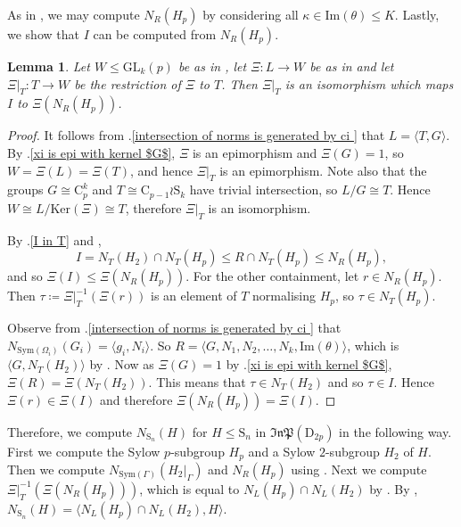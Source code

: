 \documentclass[11pt,a4paper]{article}
\newtheorem{lemma}[theorem]{Lemma}
\theoremstyle{definition}
\theoremstyle{remark}
\newcommand{\Sym}[0]{\mathrm{Sym}}
\newcommand{\InP}{\mathfrak{InP}}
\newcommand{\Sy}{\mathrm{S}}
\newcommand{\Cy}{\mathrm{C}}
\newcommand{\Di}{\mathrm{D}}
\newcommand{\Ker}{\mathrm{Ker}}
\begin{document}
As in , we may compute $N_{R}(H_p)$ by considering all $\kappa \in \mathrm{Im}(\theta) \leq K$. 
Lastly, we show that $I$ can be computed from $N_{R}(H_p)$. 


\begin{lemma}  \label{compute I from norm of groups in inp}
Let $W \leq \mathrm{GL}_k(p)$ be as in , 
let $\Xi: L \rightarrow W$ be as in  and let $\Xi|_{T} : T \rightarrow W$ be the restriction of $\Xi$ to $ T$. 
Then $\Xi|_{T}$ is an isomorphism which maps $I$ to $\Xi(N_{R}(H_p))$. 
\end{lemma}


\begin{proof}
It follows from .\ref{intersection of norms is generated by ci } that $L = \langle T, G \rangle$. 
By .\ref{xi is epi with kernel $G$}, $\Xi$ is an epimorphism and $\Xi(G)=1$, so $W = \Xi(L) = \Xi(T)$, and hence $\Xi|_T$ is an epimorphism. 
Note also that the groups $G \cong \Cy_p^k$ and $T \cong \Cy_{p-1} \wr \Sy_k$ have trivial intersection, so $L/G \cong T$. 
Hence $W \cong L/\Ker(\Xi) \cong T$, therefore $\Xi|_T$ is an isomorphism. 


By .\ref{I in T} and ,  
\[ I  = N_T(H_2) \cap N_T(H_p) \leq R \cap N_{T}(H_p) \leq N_{R}(H_p), \]
and so $\Xi(I) \leq \Xi(N_{R}(H_p))$. 
For the other containment, let $r \in N_{R}(H_p)$.
Then $\tau \coloneqq \Xi|_{T}^{-1}(\Xi(r))$ is an element of $T$ normalising $H_p$, so $\tau \in N_T(H_p)$. 

Observe from .\ref{intersection of norms is generated by ci } that  $N_{\Sym(\Omega_i)}(G_i) = \langle g_i, N_i \rangle$. So $R = \langle  G, N_1, N_2, \ldots, N_k, \mathrm{Im}(\theta) \rangle$, which is $\langle G, N_T(H_2) \rangle$ by .  
Now as $\Xi(G)=1$ by .\ref{xi is epi with kernel $G$}, $\Xi(R) = \Xi(N_T(H_2))$. 
This means that $\tau \in N_T(H_2)$ and so $\tau \in I$. Hence $\Xi(r) \in \Xi(I)$ and therefore $\Xi(N_{R}(H_p)) = \Xi(I)$. 
\end{proof}

Therefore, we compute $N_{\Sy_n}(H)$ for $H \leq \Sy_n$ in $\InP(\Di_{2p})$ in the following way. First we compute the Sylow $p$-subgroup $H_p$ and a Sylow $2$-subgroup $H_2$ of $H$. Then we compute $N_{\Sym(\Gamma)}(H_2|_{\Gamma})$ and $N_R(H_p)$
using . Next we compute $\Xi|_{T}^{-1}(\Xi(N_{R}(H_p)))$, which is equal to $N_L(H_p) \cap N_L(H_2)$ by . 
By , $N_{\Sy_n}(H) = \langle N_L(H_p) \cap N_L(H_2), H \rangle$. 
\end{document}
